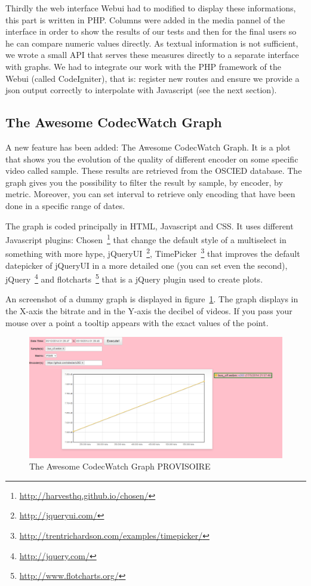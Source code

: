 \documentclass[a4paper,12pt]{article}
\begin{document}
Thirdly the web interface Webui had to modified to display these informations, this part is written in PHP.
Columns were added in the media pannel of the interface in order to show the results of our tests and then for the final users so he can compare numeric values directly.
As textual information is not sufficient, we wrote a small API that serves these measures directly to a separate interface with graphs.
We had to integrate our work with the PHP framework of the Webui (called CodeIgniter), that is: register new routes and ensure we provide a json output correctly to interpolate with Javascript (see the next section).

\subsection{The Awesome CodecWatch Graph}
A new feature has been added: The Awesome CodecWatch Graph. It is a plot that shows you the evolution of the quality of different encoder on some specific video called sample. These results are retrieved from the OSCIED database. The graph gives you the possibility to filter the result by sample, by encoder, by metric. Moreover, you can set interval to retrieve only encoding that have been done in a specific range of dates.

The graph is coded principally in HTML, Javascript and CSS. It uses different Javascript plugins: Chosen~\footnote{\url{http://harvesthq.github.io/chosen/}} that change the default style of a multiselect in something with more hype, jQueryUI~\footnote{\url{http://jqueryui.com/}}, TimePicker~\footnote{\url{http://trentrichardson.com/examples/timepicker/}} that improves the default datepicker of jQueryUI in a more detailed one (you can set even the second), jQuery~\footnote{\url{http://jquery.com/}} and flotcharts~\footnote{\url{http://www.flotcharts.org/}} that is a jQuery plugin used to create plots.

An screenshot of a dummy graph is displayed in figure~\ref{fig:graph1}. The graph displays in the X-axis the bitrate and in the Y-axis the decibel of videos. If you pass your mouse over a point a tooltip appears with the exact values of the point.

\begin{figure}[!h]
	\centering
	\includegraphics[width=1\textwidth]{figures/graph1.png}
	\caption{The Awesome CodecWatch Graph PROVISOIRE}
	\label{fig:graph1}
\end{figure}
\end{document}
